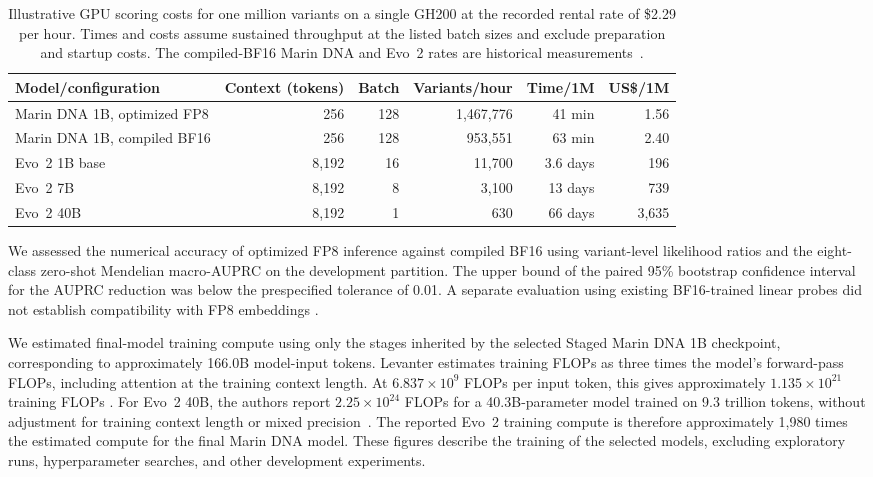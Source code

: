 \documentclass[a4paper,num-refs]{oup-contemporary}
\begin{document}
\begin{table}[t]
\centering
\small
\caption{Illustrative GPU scoring costs for one million variants
on a single GH200 at the recorded rental rate of \$2.29 per hour.
Times and costs assume sustained throughput at the listed batch
sizes and exclude preparation and startup costs.
The compiled-BF16 Marin DNA and Evo~2 rates are historical
measurements~\citep{marindna354}.}
\label{tab:scoring-cost}
\begin{tabular}{lrrrrr}
\toprule
Model/configuration & Context (tokens) & Batch &
Variants/hour & Time/1M & US\$/1M \\
\midrule
Marin DNA 1B, optimized FP8 & 256 & 128 & 1,467,776 & 41 min & 1.56 \\
Marin DNA 1B, compiled BF16 & 256 & 128 & 953,551 & 63 min & 2.40 \\
Evo~2 1B base & 8,192 & 16 & 11,700 & 3.6 days & 196 \\
Evo~2 7B & 8,192 & 8 & 3,100 & 13 days & 739 \\
Evo~2 40B & 8,192 & 1 & 630 & 66 days & 3,635 \\
\bottomrule
\end{tabular}
\end{table}

We assessed the numerical accuracy of optimized FP8 inference
against compiled BF16 using variant-level likelihood ratios
and the eight-class zero-shot Mendelian macro-AUPRC on the
development partition.
The upper bound of the paired 95\% bootstrap confidence interval
for the AUPRC reduction was below the prespecified tolerance
of 0.01.
A separate evaluation using existing BF16-trained linear probes
did not establish compatibility with FP8 embeddings
\citep{marindna430}.

We estimated final-model training compute using only the stages
inherited by the selected Staged Marin DNA 1B checkpoint,
corresponding to approximately 166.0B model-input tokens.
Levanter estimates training FLOPs as three times the model's
forward-pass FLOPs, including attention at the training context
length.
At $6.837\times10^9$ FLOPs per input token, this gives
approximately $1.135\times10^{21}$ training FLOPs
\citep{marindnaflops}.
For Evo~2 40B, the authors report $2.25\times10^{24}$ FLOPs
for a 40.3B-parameter model trained on 9.3 trillion tokens,
without adjustment for training context length or mixed
precision~\citep{evo2computetable}.
The reported Evo~2 training compute is therefore approximately
1,980 times the estimated compute for the final Marin DNA model.
These figures describe the training of the selected models,
excluding exploratory runs, hyperparameter searches, and
other development experiments.
\end{document}
